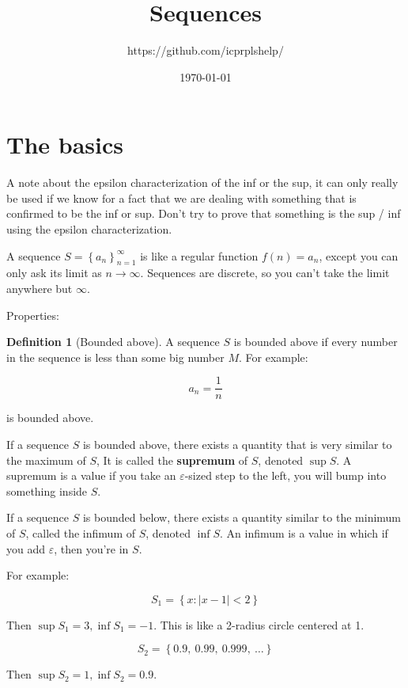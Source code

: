 \documentclass[12pt]{article}
\title{Sequences}
\author{https://github.com/icprplshelp/}
\date{\today}
\theoremstyle{plain}
\theoremstyle{remark}
\theoremstyle{definition}
\newtheorem{definition}{Definition}[section]
\begin{document}
\maketitle

{
\setcounter{tocdepth}{3}
\tableofcontents
}

\section{The basics}

A note about the epsilon characterization of the inf or the sup, it can
only really be used if we know for a fact that we are dealing with
something that is confirmed to be the inf or sup. Don't try to prove
that something is the sup / inf using the epsilon characterization.

A sequence \(S = \left\{ a_{n} \right\}_{n = 1}^{\infty}\) is like a
regular function \(f(n) = a_{n}\), except you can only ask its limit as
\(n \rightarrow \infty\). Sequences are discrete, so you can't take the
limit anywhere but \(\infty\).

Properties:

\begin{definition}[Bounded above]
A sequence \(S\) is bounded above
if every number in the sequence is less than some big number \(M\). For
example:

\[a_{n} = \frac{1}{n}\]

is bounded above.
\end{definition}

If a sequence \(S\) is bounded above, there exists a quantity that is
very similar to the maximum of \(S\), It is called the \textbf{supremum}
of \(S\), denoted \(\sup S\). A supremum is a value if you take an
\(\varepsilon\)-sized step to the left, you will bump into something
inside \(S\).

If a sequence \(S\) is bounded below, there exists a quantity similar to
the minimum of \(S\), called the infimum of \(S\), denoted \(\inf S\).
An infimum is a value in which if you add \(\varepsilon\), then you're
in \(S\).

For example:

\[S_{1} = \left\{ x:|x - 1| < 2 \right\}\]

Then \(\sup S_{1} = 3,\inf S_{1} = - 1\). This is like a 2-radius circle
centered at 1.

\[S_{2} = \left\{ 0.9,\ 0.99,\ 0.999,\ \ldots \right\}\]

Then \(\sup S_{2} = 1,\inf S_{2} = 0.9\).
\end{document}
